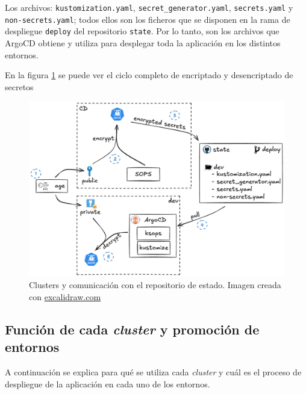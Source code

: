 Los archivos: \texttt{kustomization.yaml}, \texttt{secret\_generator.yaml}, \texttt{secrets.yaml} y \texttt{non-secrets.yaml}; todos ellos son los ficheros que se disponen en la rama de despliegue \texttt{deploy} del repositorio \texttt{state}. Por lo tanto, son los archivos que ArgoCD obtiene y utiliza para desplegar toda la aplicación en los distintos entornos.

En la figura \ref{fig:secrets} se puede ver el ciclo completo de encriptado y desencriptado de secretos

\begin{figure}
  \centerline{\includegraphics[width=13.5cm]{figuras/secrets}}
  \caption{Clusters y comunicación con el repositorio de estado. Imagen creada con \href{https://excalidraw.com}{excalidraw.com}}
  \label{fig:secrets}
\end{figure}

\subsection*{Función de cada \textit{cluster} y promoción de entornos}

A continuación se explica para qué se utiliza cada \textit{cluster} y cuál es el proceso de despliegue de la aplicación en cada uno de los entornos.

